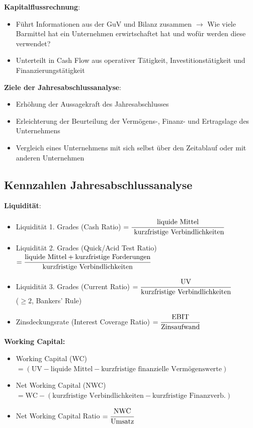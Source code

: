 \textbf{Kapitalflussrechnung}: 
\begin{itemize}
	\item Führt Informationen aus der GuV und Bilanz zusammen $\rightarrow$ Wie viele Barmittel hat ein Unternehmen erwirtschaftet hat und wofür werden diese verwendet?
	\item Unterteilt in Cash Flow aus operativer Tätigkeit, Investitionstätigkeit und Finanzierungstätigkeit
\end{itemize}

\textbf{Ziele der Jahresabschlussanalyse}:
\begin{itemize}
	\item Erhöhung der Aussagekraft des Jahresabschlusses
	\item Erleichterung der Beurteilung der Vermögens-, Finanz- und Ertragslage des Unternehmens
	\item Vergleich eines Unternehmens mit sich selbst über den Zeitablauf oder mit anderen Unternehmen
\end{itemize}

\subsection{Kennzahlen Jahresabschlussanalyse}
\textbf{Liquidität}:
\begin{itemize}
	\item Liquidität 1. Grades (Cash Ratio) $=\cfrac{\text{liquide Mittel}}{\text{ kurzfristige Verbindlichkeiten}}$	
	\item Liquidität 2. Grades (Quick/Acid Test Ratio) $=\cfrac{\text{liquide Mittel}+\text{kurzfristige Forderungen}}{\text{kurzfristige Verbindlichkeiten}}$
	\item Liquidität 3. Grades (Current Ratio) $=\cfrac{\text{UV}}{\text{kurzfristige Verbindlichkeiten}}$ \\($\geq 2$, Bankers' Rule)
	\item Zinsdeckungsrate (Interest Coverage Ratio) $=\cfrac{\text{EBIT}}{\text{Zinsaufwand}}$
\end{itemize}
	
\textbf{Working Capital:}
\begin{itemize}
	\item Working Capital (WC) $=(\text{UV} -\text{liquide Mittel} -  \text{kurzfristige finanzielle Vermögenswerte})$	
	\item Net Working Capital (NWC) $=\text{WC}-(\text{kurzfristige Verbindlichkeiten}-\text{kurzfristige Finanzverb.})$
	\item Net Working Capital Ratio $=\cfrac{\text{NWC}}{\text{Umsatz}}$
\end{itemize}

